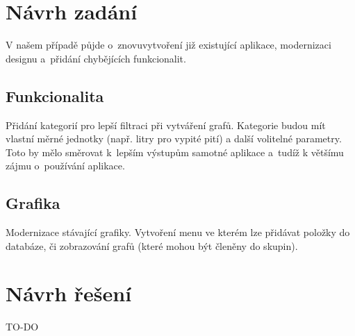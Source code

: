 \documentclass[12pt, titlepage]{article}
\begin{document}
\section{Návrh zadání}
V našem případě půjde o~znovuvytvoření již existující aplikace, modernizaci designu a~přidání chybějících funkcionalit.
\subsection{Funkcionalita}
Přidání kategorií pro lepší filtraci při vytváření grafů. Kategorie budou mít vlastní měrné jednotky (např. litry pro vypité pití) a další volitelné parametry.\\
Toto by mělo směrovat k~lepším výstupům samotné aplikace a~tudíž k většímu zájmu o~používání aplikace.
\subsection{Grafika}
Modernizace stávající grafiky. Vytvoření menu ve kterém lze přidávat položky do databáze, či zobrazování grafů (které mohou být členěny do skupin).


\section{Návrh řešení}
TO-DO
\end{document}
